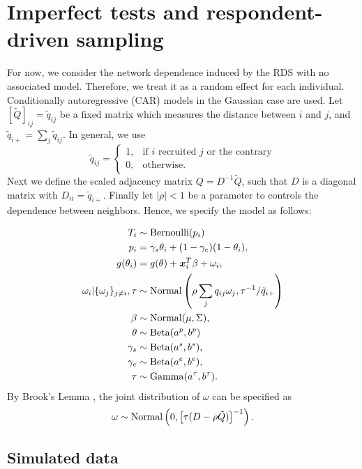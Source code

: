 \section{Imperfect tests and respondent-driven sampling}

For now, we consider the network dependence induced by the RDS with no
associated model. Therefore, we treat it as a random effect for
each individual. Conditionally autoregressive (CAR) models in the
Gaussian case are used. Let $[\tilde{Q}]_{ij} = \tilde{q}_{ij}$ be a fixed matrix which measures the distance between $i$
and $j$, and $\tilde{q}_{i+} = \sum_{j} \tilde{q}_{ij}$. In general, we use
$$
\tilde{q}_{ij} = \begin{cases}
  1, &\text{if } i \text{ recruited } j \text{ or the contrary} \\
  0, &\text{otherwise.} 
\end{cases}
$$
Next we define the scaled adjacency matrix $Q = D^{-1}\tilde{Q}$, such that $D$
is a diagonal matrix with $D_{ii} = \tilde{q}_{i+}$. Finally let $|\rho| < 1$ be a
parameter to controls the dependence between neighbors. Hence, we specify the
model as follows:

\begin{equation}
  \begin{aligned}
    T_i &\sim \operatorname{Bernoulli}(p_i) \\
    p_i &= \gamma_s\theta_i + (1-\gamma_e)(1 - \theta_i),  \\
    g(\theta_i) &= g(\theta) + \boldsymbol{x}_i^T\beta + \omega_i,  \\
    \omega_i|\{\omega_j\}_{j\neq i}, \tau &\sim \operatorname{Normal}\left(\rho\sum_j q_{ij}\omega_j, \tau^{-1}/\tilde{q}_{i+}\right) \\
    \beta &\sim \operatorname{Normal}(\mu, \Sigma), \\ 
    \theta &\sim \operatorname{Beta}(a^p, b^p) \\
    \gamma_s &\sim \operatorname{Beta}(a^s, b^s), \\
    \gamma_e &\sim \operatorname{Beta}(a^e, b^e), \\  
    \tau &\sim \operatorname{Gamma}(a^{\tau}, b^{\tau}).
  \end{aligned}  
\end{equation}
By Brook's Lemma \cite[]{brook1964distinction}, the joint distribution of
$\omega$ can be specified as 
$$
\omega \sim \operatorname{Normal}\left(0, \left[\tau (D - \rho \tilde{Q})\right]^{-1}\right).
$$

\subsection{Simulated data}

